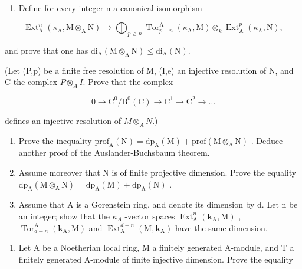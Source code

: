 \begin{enumerate}
\def\labelenumi{\alph{enumi})}
\tightlist
\item
  Define for every integer n a canonical isomorphism
\end{enumerate}

\[
\operatorname{Ext} _ {\mathrm{A}} ^ {n} (\kappa_ {\mathrm{A}}, \mathrm{M} \otimes_ {\mathrm{A}} \mathrm{N}) \longrightarrow \bigoplus_ {p \geqslant n} \operatorname{Tor} _ {p - n} ^ {\mathrm{A}} (\kappa_ {\mathrm{A}}, \mathrm{M}) \otimes_ {k} \operatorname{Ext} _ {\mathrm{A}} ^ {p} (\kappa_ {\mathrm{A}}, \mathrm{N}),
\]

and prove that one has \(\mathrm{di}_{\mathrm{A}}(\mathrm{M}\otimes_{\mathrm{A}}\mathrm{N})\leqslant \mathrm{di}_{\mathrm{A}}(\mathrm{N})\).

(Let (P,p) be a finite free resolution of M, (I,e) an injective resolution of N, and C the complex \(P \otimes_A I\). Prove that the complex

\[
0 \to \mathrm{C} ^ {0} / \mathrm{B} ^ {0} (\mathrm{C}) \to \mathrm{C} ^ {1} \to \mathrm{C} ^ {2} \to \dots
\]

defines an injective resolution of \(M \otimes_A N\).)

\begin{enumerate}
\def\labelenumi{\alph{enumi})}
\setcounter{enumi}{1}
\item
  Prove the inequality \(\mathrm{prof}_{\mathrm{A}}(\mathrm{N}) = \mathrm{dp}_{\mathrm{A}}(\mathrm{M}) + \mathrm{prof}(\mathrm{M} \otimes_{\mathrm{A}} \mathrm{N})\) . Deduce another proof of the Auslander-Buchsbaum theorem.
\item
  Assume moreover that N is of finite projective dimension. Prove the equality \(\mathrm{dp}_{\mathrm{A}}(\mathrm{M}\otimes_{\mathrm{A}}\mathrm{N})=\mathrm{dp}_{\mathrm{A}}(\mathrm{M})+\mathrm{dp}_{\mathrm{A}}(\mathrm{N})\) .
\item
  Assume that A is a Gorenstein ring, and denote its dimension by d. Let n be an integer; show that the \(\kappa_{A}\) -vector spaces \(\operatorname{Ext}_{\mathrm{A}}^{n}(\mathbf{k}_{\mathrm{A}},\mathrm{M})\) , \(\operatorname{Tor}_{d-n}^{\mathrm{A}}(\mathbf{k}_{\mathrm{A}},\mathrm{M})\) and \(\operatorname{Ext}_{\mathrm{A}}^{d-n}(\mathrm{M},\mathbf{k}_{\mathrm{A}})\) have the same dimension.
\end{enumerate}

\begin{enumerate}
\def\labelenumi{\arabic{enumi})}
\setcounter{enumi}{6}
\tightlist
\item
  Let A be a Noetherian local ring, M a finitely generated A-module, and T a finitely generated A-module of finite injective dimension. Prove the equality
\end{enumerate}

